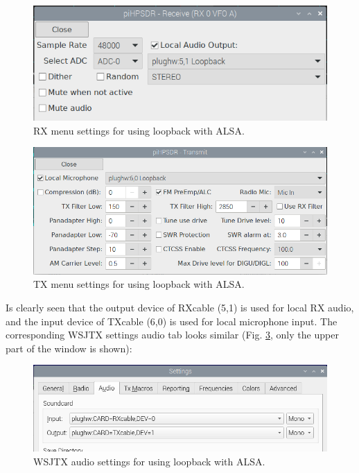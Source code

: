 \documentclass[12pt]{book}
\begin{document}
\begin{figure}[ht]
\center
\includegraphics[width=12cm]{rx_settings_alsa_audio.png}
\caption{RX menu settings for using loopback with ALSA.}
\label{fig:rx_settings_alsa_audio}
\end{figure}

\begin{figure}[ht]
\center
\includegraphics[width=12cm]{tx_settings_alsa_audio.png}
\caption{TX menu settings for using loopback with ALSA.}
\label{fig:tx_settings_alsa_audio}
\end{figure}

Is clearly seen that the output device of RXcable (5,1) is used for local RX audio, and the input
device of TXcable (6,0) is used for local microphone input. The corresponding WSJTX settings audio
tab looks similar (Fig. \ref{fig:wsjtx_settings_alsa_audio}, only the upper part of the
window is shown):

\begin{figure}[ht]
\center
\includegraphics[width=12cm]{wsjtx_settings_alsa_audio.png}
\caption{WSJTX audio settings for using loopback with ALSA.}
\label{fig:wsjtx_settings_alsa_audio}
\end{figure}
\end{document}
